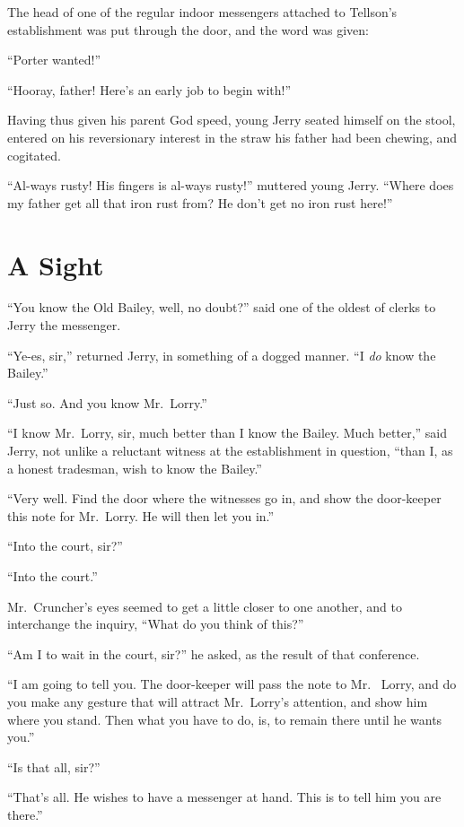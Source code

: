 The head of one of the regular indoor messengers attached to
Tellson's establishment was put through the door, and the word was
given:

``Porter wanted!''

``Hooray, father!  Here's an early job to begin with!''

Having thus given his parent God speed, young Jerry seated himself on
the stool, entered on his reversionary interest in the straw his
father had been chewing, and cogitated.

``Al-ways rusty!  His fingers is al-ways rusty!'' muttered young Jerry.
``Where does my father get all that iron rust from?  He don't get no
iron rust here!''



\chapter{A Sight}


``You know the Old Bailey, well, no doubt?'' said one of the oldest of
clerks to Jerry the messenger.

``Ye-es, sir,'' returned Jerry, in something of a dogged manner.  ``I
\emph{do} know the Bailey.''

``Just so.  And you know Mr.\ Lorry.''

``I know Mr.\ Lorry, sir, much better than I know the Bailey.  Much
better,'' said Jerry, not unlike a reluctant witness at the
establishment in question, ``than I, as a honest tradesman, wish to
know the Bailey.''

``Very well.  Find the door where the witnesses go in, and show the
door-keeper this note for Mr.\ Lorry.  He will then let you in.''

``Into the court, sir?''

``Into the court.''

Mr.\ Cruncher's eyes seemed to get a little closer to one another, and
to interchange the inquiry, ``What do you think of this?''

``Am I to wait in the court, sir?'' he asked, as the result of that
conference.

``I am going to tell you.  The door-keeper will pass the note to Mr.\ %
Lorry, and do you make any gesture that will attract Mr.\ Lorry's
attention, and show him where you stand.  Then what you have to do,
is, to remain there until he wants you.''

``Is that all, sir?''

``That's all.  He wishes to have a messenger at hand.  This is to tell
him you are there.''

